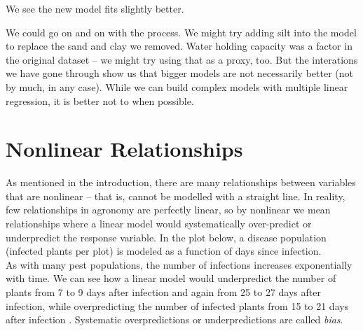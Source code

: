 \documentclass[
]{book}
\begin{document}
We see the new model fits slightly better.

We could go on and on with the process. We might try adding silt into the model to replace the sand and clay we removed. Water holding capacity was a factor in the original dataset -- we might try using that as a proxy, too. But the interations we have gone through show us that bigger models are not necessarily better (not by much, in any case). While we can build complex models with multiple linear regression, it is better not to when possible.

\hypertarget{nonlinear-relationships}{%
\section{Nonlinear Relationships}\label{nonlinear-relationships}}

As mentioned in the introduction, there are many relationships between variables that are nonlinear -- that is, cannot be modelled with a straight line. In reality, few relationships in agronomy are perfectly linear, so by nonlinear we mean relationships where a linear model would systematically over-predict or underpredict the response variable. In the plot below, a disease population (infected plants per plot) is modeled as a function of days since infection.\\
As with many pest populations, the number of infections increases exponentially with time. We can see how a linear model would underpredict the number of plants from 7 to 9 days after infection and again from 25 to 27 days after infection, while overpredicting the number of infected plants from 15 to 21 days after infection . Systematic overpredictions or underpredictions are called \emph{bias}.
\end{document}
